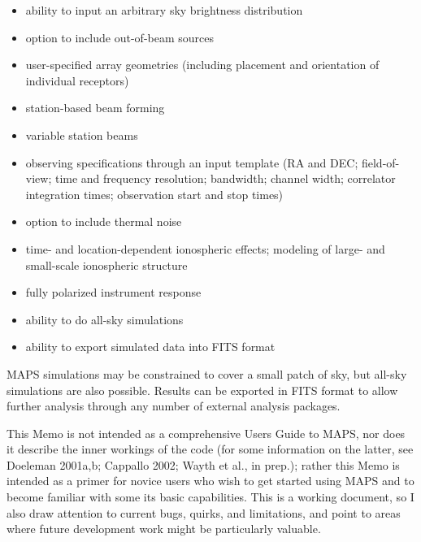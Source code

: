 \documentclass[12pt,psfig]{article}
\begin{document}
\begin{itemize}

\item ability to input an arbitrary sky brightness distribution

\item option to include out-of-beam sources

\item user-specified array geometries (including placement and
  orientation of individual receptors)

\item station-based beam forming

\item variable station beams

\item observing specifications through an input template (RA and
  DEC; field-of-view; time
  and frequency resolution; bandwidth; channel width; correlator
  integration times; observation start and stop times)

\item option to include thermal noise

\item time-
and location-dependent ionospheric effects; modeling of large- and
small-scale ionospheric structure

\item fully polarized instrument response

\item ability to do all-sky simulations

\item ability to export simulated data into FITS format

\end{itemize}

\noindent MAPS simulations may be constrained to cover a small patch
of sky, but all-sky simulations are also possible. Results can be
exported in FITS format to allow further analysis through any number of
external analysis packages.

This Memo is not intended as a comprehensive Users Guide to MAPS, 
nor does it describe the inner
workings of the code (for some information on 
the latter, see Doeleman
2001a,b; Cappallo 2002; Wayth et al., in prep.); rather this Memo
is intended as a primer for 
novice users who wish to get started using MAPS and to become familiar
with some its basic capabilities. This is a working document, so I
also draw attention to current
bugs, quirks, and limitations, and point to areas where future development
work might be particularly valuable. 
\end{document}
